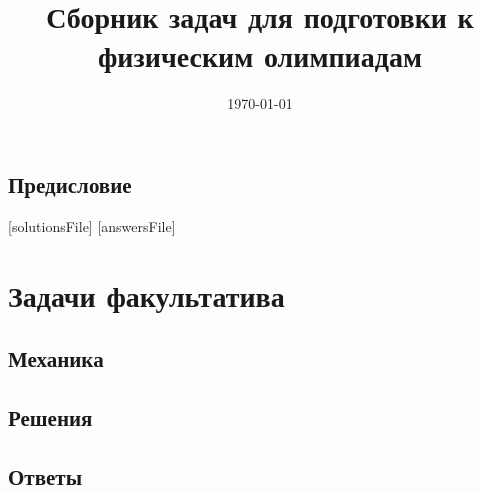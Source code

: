 \documentclass[a5paper, oneside]{book}
\title{Сборник задач для подготовки к физическим олимпиадам}
\date{\today}
\begin{document}
\maketitle
\tableofcontents

\chapter*{Предисловие} 


[solutionsFile]
[answersFile]

\part{Задачи факультатива}

\chapter{Механика}


%
%
%
%
%
%
%
%
%
%
%
%
%
%
%


\chapter{Решения}

\chapter{Ответы}
\end{document}
